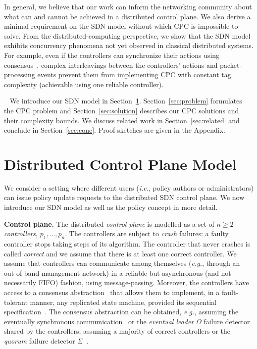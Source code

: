 \documentclass[11pt,pdftex,letter]{article}
\newcommand{\smartparagraph}[1]{\noindent{\bf #1}\ }
\newcommand{\eg}{{\it e.g.}}
\newcommand{\ie}{{\it i.e.}}
\newcommand{\mcnote}[1]{\textcolor{heraldBlue}{\small \bf [MC: #1]}}
\newcommand{\ssnote}[1]{\textcolor{heraldBlue}{\small \bf [SS: #1]}}
\newcommand{\mcnote}[1]{}
\newcommand{\ssnote}[1]{}
\begin{document}
In general, we believe that our work can inform the networking community about what can and
cannot be achieved in a distributed control plane.
We also derive a minimal requirement on the SDN model without which CPC is impossible to
solve.
From the distributed-computing perspective,
we show that the SDN model exhibits concurrency phenomena not
yet observed in classical distributed systems.
For example, even if the controllers can synchronize their actions using
consensus~\cite{Her91},  complex interleavings between the
controllers' actions and packet-processing events prevent them from implementing CPC with
constant tag complexity (achievable using one reliable controller).

\smartparagraph{Roadmap.} We introduce our
SDN model in Section~\ref{sec:model}. Section~\ref{sec:problem} formulates the CPC problem
and Section~\ref{sec:solution} describes our CPC solutions and their
complexity bounds. We discuss related work in
Section~\ref{sec:related} and conclude in Section~\ref{sec:conc}.
Proof sketches are given in the Appendix.


\section{Distributed Control Plane Model}\label{sec:model}

We consider a setting where different users (\ie, policy authors or administrators) can issue
policy update requests to the distributed SDN control plane.
We now introduce our SDN model as well as the policy concept in more detail.

%
\vspace{1mm}\noindent\textbf{Control plane.}
The distributed \emph{control plane} is modelled as a set of $n\geq 2$ \emph{controllers}, $p_1,\ldots,p_n$.
The controllers are subject to \emph{crash} failures: a
faulty controller stops taking steps of its algorithm.
The controller that never crashes is called \emph{correct} and we assume
that there is at least one correct controller.
We assume that controllers can communicate among themselves (\eg, through an out-of-band management network) in a reliable but asynchronous
(and not necessarily FIFO) fashion, using message-passing. Moreover,
the controllers have access to a consensus
abstraction~\cite{FLP85} that allows them to implement, in a fault-tolerant manner,
any replicated state machine, provided its sequential
specification~\cite{Her91}.
The consensus abstraction can be obtained, \eg, assuming
the eventually synchronous communication~\cite{DDS87} or
the \emph{eventual leader} $\Omega$ failure detector~\cite{CHT96}
shared by the controllers, assuming a majority of correct controllers
or the \emph{quorum} failure detector $\Sigma$~\cite{DFG10}.
\end{document}
